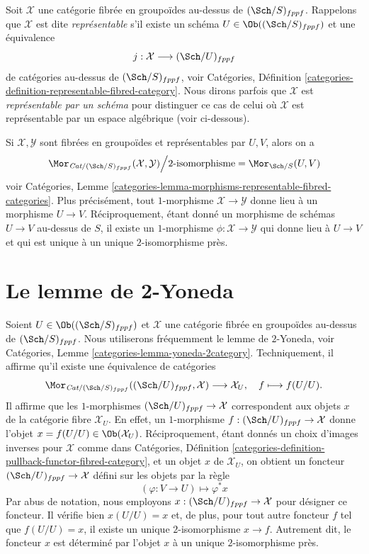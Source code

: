 \medskip\noindent
Soit $\mathcal{X}$ une catégorie fibrée en groupoïdes au-dessus de
$(\Sch/S)_{fppf}$. Rappelons que $\mathcal{X}$
est dite {\it représentable} s'il existe un
schéma $U \in \Ob((\Sch/S)_{fppf})$ et une
équivalence
$$
j : \mathcal{X} \longrightarrow (\Sch/U)_{fppf}
$$
de catégories au-dessus de $(\Sch/S)_{fppf}$, voir
Catégories,
Définition \ref{categories-definition-representable-fibred-category}.
Nous dirons parfois que $\mathcal{X}$ est
{\it représentable par un schéma} pour distinguer ce cas de celui où
$\mathcal{X}$ est représentable par un espace algébrique (voir
ci-dessous).

\medskip\noindent
Si $\mathcal{X}, \mathcal{Y}$ sont fibrées en groupoïdes et
représentables par $U, V$, alors on a
\begin{equation}
\label{equation-morphisms-schemes}
\Mor_{\textit{Cat}/(\Sch/S)_{fppf}}(\mathcal{X}, \mathcal{Y})
\Big/
2\text{-isomorphisme}
=
\Mor_{\Sch/S}(U, V)
\end{equation}
voir
Catégories,
Lemme \ref{categories-lemma-morphisms-representable-fibred-categories}.
Plus précisément, tout $1$-morphisme $\mathcal{X} \to \mathcal{Y}$
donne lieu à un morphisme $U \to V$. Réciproquement, étant donné un morphisme
de schémas $U \to V$ au-dessus de $S$, il existe un $1$-morphisme
$\phi : \mathcal{X} \to \mathcal{Y}$ qui donne lieu à $U \to V$
et qui est unique à un unique $2$-isomorphisme près.






\section{Le lemme de 2-Yoneda}
\label{section-2-yoneda}

\noindent
Soient $U \in \Ob((\Sch/S)_{fppf})$ et $\mathcal{X}$ une
catégorie fibrée en groupoïdes au-dessus de $(\Sch/S)_{fppf}$.
Nous utiliserons fréquemment le lemme de $2$-Yoneda, voir
Catégories, Lemme \ref{categories-lemma-yoneda-2category}.
Techniquement, il affirme qu'il existe une équivalence de catégories
$$
\Mor_{\textit{Cat}/(\Sch/S)_{fppf}}(
(\Sch/U)_{fppf}, \mathcal{X})
\longrightarrow
\mathcal{X}_U, \quad
f \longmapsto f(U/U).
$$
Il affirme que les $1$-morphismes $(\Sch/U)_{fppf} \to \mathcal{X}$
correspondent aux objets $x$ de la catégorie fibre $\mathcal{X}_U$.
En effet, un $1$-morphisme $f : (\Sch/U)_{fppf} \to \mathcal{X}$
donne l'objet $x = f(U/U) \in \Ob(\mathcal{X}_U)$.
Réciproquement, étant donnés un choix d'images inverses pour $\mathcal{X}$ comme dans
Catégories,
Définition \ref{categories-definition-pullback-functor-fibred-category},
et un objet $x$ de $\mathcal{X}_U$, on obtient un foncteur
$(\Sch/U)_{fppf} \to \mathcal{X}$ défini sur les objets par la règle
$$
(\varphi : V \to U) \longmapsto \varphi^*x
$$
Par abus de notation, nous employons
$x : (\Sch/U)_{fppf} \to \mathcal{X}$
pour désigner ce foncteur. Il vérifie bien $x(U/U) = x$
et, de plus, pour tout autre foncteur $f$ tel que $f(U/U) = x$, il existe
un unique $2$-isomorphisme $x \to f$. Autrement dit, le foncteur $x$
est déterminé par l'objet $x$ à un unique $2$-isomorphisme près.

